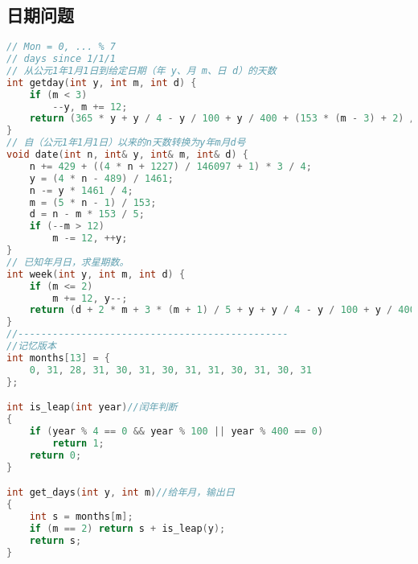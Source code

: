 \subsection{日期问题}
\begin{lstlisting}[language=C++]
// Mon = 0, ... % 7
// days since 1/1/1
// 从公元1年1月1日到给定日期（年 y、月 m、日 d）的天数
int getday(int y, int m, int d) {
    if (m < 3)
        --y, m += 12;
    return (365 * y + y / 4 - y / 100 + y / 400 + (153 * (m - 3) + 2) / 5 + d - 307);
}
// 自（公元1年1月1日）以来的n天数转换为y年m月d号
void date(int n, int& y, int& m, int& d) {
    n += 429 + ((4 * n + 1227) / 146097 + 1) * 3 / 4;
    y = (4 * n - 489) / 1461;
    n -= y * 1461 / 4;
    m = (5 * n - 1) / 153;
    d = n - m * 153 / 5;
    if (--m > 12)
        m -= 12, ++y;
}
// 已知年月日，求星期数。
int week(int y, int m, int d) {
    if (m <= 2)
        m += 12, y--;
    return (d + 2 * m + 3 * (m + 1) / 5 + y + y / 4 - y / 100 + y / 400) % 7 + 1;
}
//-----------------------------------------------
//记忆版本
int months[13] = {
    0, 31, 28, 31, 30, 31, 30, 31, 31, 30, 31, 30, 31
};

int is_leap(int year)//闰年判断
{
    if (year % 4 == 0 && year % 100 || year % 400 == 0)
        return 1;
    return 0;
}

int get_days(int y, int m)//给年月，输出日
{
    int s = months[m];
    if (m == 2) return s + is_leap(y);
    return s;
}
\end{lstlisting}
